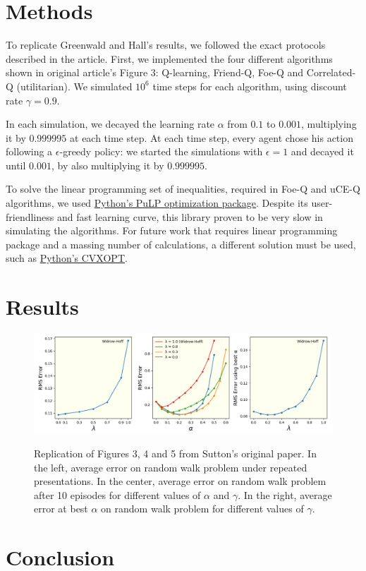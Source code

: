 \documentclass{article}
\begin{document}
    \section{Methods}
    \label{sec:methods}
    To replicate Greenwald and Hall's results, we followed the exact protocols described in the article.
    First, we implemented the four different algorithms shown in original article's Figure 3: Q-learning, Friend-Q, Foe-Q and Correlated-Q (utilitarian).
    We simulated $10^{6}$ time steps for each algorithm, using discount rate $\gamma = 0.9$.

    In each simulation, we decayed the learning rate $\alpha$ from $0.1$ to $0.001$, multiplying it by $0.999995$ at each time step.
    At each time step, every agent chose his action following a $\epsilon$-greedy policy: we started the simulations with $\epsilon = 1$ and decayed it until $0.001$, by also multiplying it by $0.999995$.

    To solve the linear programming set of inequalities, required in Foe-Q and uCE-Q algorithms, we used \href{https://pythonhosted.org/PuLP/}{Python's PuLP optimization package}.
    Despite its user-friendliness and fast learning curve, this library proven to be very slow in simulating the algorithms.
    For future work that requires linear programming package and a massing number of calculations, a different solution must be used, such as \href{https://cvxopt.org/}{Python's CVXOPT}.

    \section{Results}
    \label{sec:results}

    \begin{figure}[t]
        \includegraphics[width=\textwidth]{./images/figure.png}
        \centering
        \label{fig2}
        \caption{Replication of Figures 3, 4 and 5 from Sutton's original paper.
        In the left, average error on random walk problem under repeated presentations.
        In the center, average error on random walk problem after 10 episodes for different values of $\alpha$ and $\gamma$.
        In the right, average error at best $\alpha$ on random walk problem for different values of $\gamma$.}
    \end{figure}

    \lipsum[0]
    \lipsum[1]
    \lipsum[2]
    \lipsum[3]

    \section{Conclusion}
    \label{sec:conclusion}

    \lipsum[0]

\printbibliography
\end{document}
